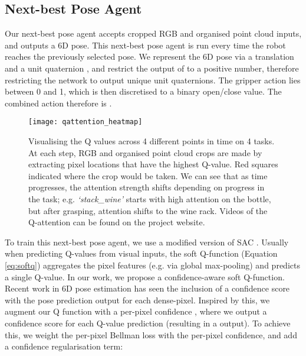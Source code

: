 \documentclass[letterpaper, 10 pt, journal, twoside]{IEEEtran}
\begin{document}
\subsection{Next-best Pose Agent}
\label{sec:phase2}

Our next-best pose agent accepts cropped RGB  and organised point cloud  inputs, and outputs a 6D pose. This next-best pose agent is run every time the robot reaches the previously selected pose. We represent the 6D pose via a translation  and a unit quaternion , and restrict the  output of  to a positive number, therefore restricting the network to output unique unit quaternions. The gripper action  lies between 0 and 1, which is then discretised to a binary open/close value. The combined action therefore is .

\begin{figure}
\centering
\texttt{[image: qattention\_heatmap]}
\caption{Visualising the Q values across 4 different points in time on 4 tasks. At each step, RGB and organised point cloud crops are made by extracting pixel locations that have the highest Q-value. Red squares indicated where the crop would be taken. We can see that as time progresses, the attention strength shifts depending on progress in the task; e.g. \textit{`stack\_wine'} starts with high attention on the bottle, but after grasping, attention shifts to the wine rack. Videos of the Q-attention can be found on the project website.}
\label{fig:Q-attention_vis}
\vspace{-15pt}
\end{figure}

To train this next-best pose agent, we use a modified version of SAC \cite{haarnoja2018soft}. Usually when predicting Q-values from visual inputs, the soft Q-function (Equation \ref{eq:softq}) aggregates the pixel features (e.g. via global max-pooling) and predicts a single Q-value. In our work, we propose a confidence-aware soft Q-function. Recent work in 6D pose estimation \cite{wang2019densefusion, wada2020morefusion} has seen the inclusion of a confidence score  with the pose prediction output for each dense-pixel. Inspired by this, we augment our Q function with a per-pixel confidence , where we output a confidence score for each Q-value prediction (resulting in a  output). To achieve this, we weight the per-pixel Bellman loss with the per-pixel confidence, and add a confidence regularisation term:
\end{document}
